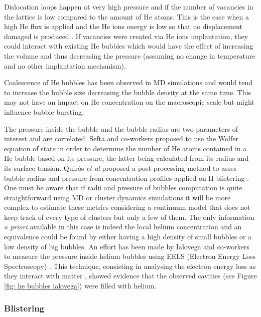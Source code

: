 Dislocation loops happen at very high pressure and if the number of vacancies in the lattice is low compared to the amount of He atoms.
This is the case when a high He flux is applied and the He ions energy is low so that no displacement damaged is produced \cite{sefta_surface_2013}.
If vacancies were created via He ions implantation, they could interact with existing He bubbles which would have the effect of increasing the volume and thus decreasing the pressure (assuming no change in temperature and no other implantation mechanism).

Coalescence of He bubbles has been observed in MD simulations  and would tend to increase the bubble size decreasing the bubble density at the same time.
This may not have an impact on He concentration on the macroscopic scale but might influence bubble bursting.

The pressure inside the bubble and the bubble radius are two parameters of interest and are correlated.
Sefta and co-workers  proposed to use the Wolfer equation of state in order to determine the number of He atoms contained in a He bubble based on its pressure, the latter being calculated from its radius and its surface tension.
Quir\'os \textit{et al} proposed a post-processing method to asses bubble radius and pressure from concentration profiles applied on H blistering .
One must be aware that if radii and pressure of bubbles computation is quite straightforward using MD  or cluster dynamics  simulations it will be more complex to estimate these metrics considering a continuum model that does not keep track of every type of clusters but only a few of them.
The only information \textit{a priori} available in this case is indeed the local helium concentration and an equivalence could be found by either having a high density of small bubbles or a low density of big bubbles.
An effort has been made by Ialovega and co-workers to measure the pressure inside helium bubbles using EELS (Electron Energy Loss Spectroscopy) .
This technique, consisting in analysing the electron energy loss as they interact with matter , showed evidence that the observed cavities (see Figure \ref{fig: he bubbles ialovega}) were filled with helium.

\subsubsection{Blistering}

